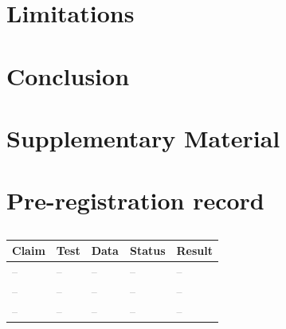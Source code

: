 \documentclass[runningheads]{llncs}
\newcommand{\x}{\textcolor{gray}{--}}          %
\newcommand{\figbox}[2]{\fbox{\parbox[c][#2][c]{0.95\linewidth}{\centering\small\textcolor{gray}{#1}}}}
\begin{document}
\begin{figure}[t]
\centering
\figbox{Object-vs-background separability (AUROC) of each module's gate, with 64$\times$64 modules pooled to low resolution; example gates per module.}{4cm}
\caption{}
\label{fig:why-lowres}
\end{figure}

\section{Limitations}
\label{sec:limitations}

\section{Conclusion}
\label{sec:conclusion}




\clearpage
\appendix
\section*{Supplementary Material}

\section{Pre-registration record}
\label{sec:s-prereg}

\begin{table}[h]
\centering
\caption{}
\label{tab:s-prereg}
\footnotesize\setlength{\tabcolsep}{3pt}
\begin{tabular}{@{}p{3.2cm}p{2.6cm}p{2cm}p{1.8cm}p{1.6cm}@{}}
\toprule
Claim & Test & Data & Status & Result \\
\midrule
\x & \x & \x & \x & \x \\
\x & \x & \x & \x & \x \\
\x & \x & \x & \x & \x \\
\bottomrule
\end{tabular}
\end{table}
\end{document}
